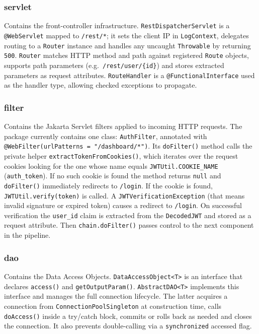 \subsubsection*{servlet}
Contains the front-controller infrastructure. \texttt{RestDispatcherServlet} is a \texttt{@WebServlet} mapped to \texttt{/rest/*}; it sets the client IP in \texttt{LogContext}, delegates routing to a \texttt{Router} instance and handles any uncaught \texttt{Throwable} by returning \texttt{500}. \texttt{Router} matches HTTP method and path against registered \texttt{Route} objects, supports path parameters (e.g.\ \texttt{/rest/user/\{id\}}) and stores extracted parameters as request attributes. \texttt{RouteHandler} is a \texttt{@FunctionalInterface} used as the handler type, allowing checked exceptions to propagate.
 
\subsubsection*{filter}
Contains the Jakarta Servlet filters applied to incoming HTTP requests. The package currently contains one class: \texttt{AuthFilter}, annotated with \texttt{@WebFilter(urlPatterns = "/dashboard/*")}. Its \texttt{doFilter()} method calls the private helper \texttt{extractTokenFromCookies()}, which iterates over the request cookies looking for the one whose name equals \texttt{JWTUtil.COOKIE\_NAME} (\texttt{auth\_token}). If no such cookie is found the method returns \texttt{null} and \texttt{doFilter()} immediately redirects to \texttt{/login}. If the cookie is found, \texttt{JWTUtil.verify(token)} is called. A \texttt{JWTVerificationException} (that means invalid signature or expired token) causes a redirect to \texttt{/login}. On successful verification the \texttt{user\_id} claim is extracted from the \texttt{DecodedJWT} and stored as a request attribute. Then \texttt{chain.doFilter()} passes control to the next component in the pipeline.
 
\subsubsection*{dao}
Contains the Data Access Objects. \texttt{DataAccessObject<T>} is an interface that declares \texttt{access()} and \texttt{getOutputParam()}. \texttt{AbstractDAO<T>} implements this interface and manages the full connection lifecycle. The latter acquires a connection from \texttt{ConnectionPoolSingleton} at construction time, calls \texttt{doAccess()} inside a try/catch block, commits or rolls back as needed and closes the connection. It also prevents double-calling via a \texttt{synchronized} accessed flag.
 

